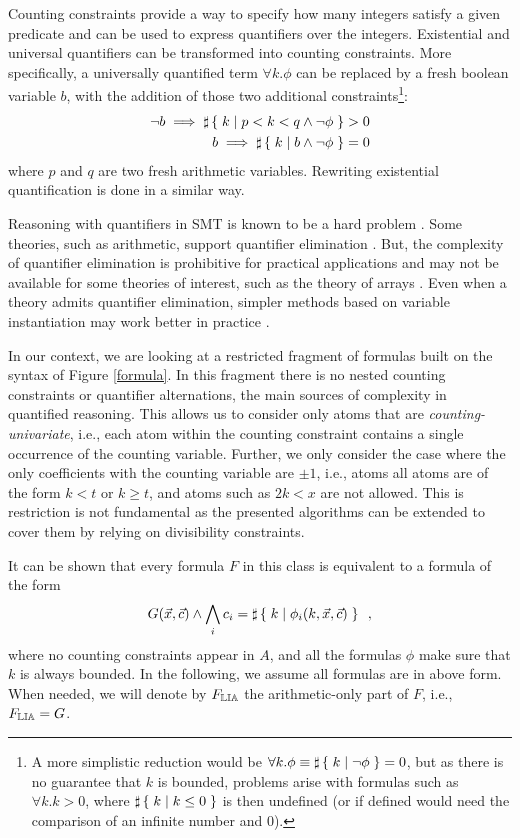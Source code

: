 Counting constraints provide a way to specify how many integers
satisfy a given predicate and can be used to
express quantifiers over the integers. Existential and universal quantifiers can
be transformed into counting constraints. More specifically, a universally
quantified term $\forall k . \phi$ can be replaced by a fresh boolean variable
$b$, with the addition of those two additional constraints\footnote{A more simplistic reduction would be
  $\forall k . \phi \equiv \sharp\left\lbrace\;k\;|\;\lnot \phi\;\right\rbrace = 0$, but as there is no guarantee
  that $k$ is bounded, problems arise with formulas such as $\forall k . k > 0$,
  where $\sharp\left\lbrace\;k\;|\;k\leq 0\;\right\rbrace$ is then undefined (or if defined would need the
  comparison of an infinite number and $0$).}:
\begin{align*}
  \lnot b \implies \sharp\left\lbrace\;k\;|\;p < k < q \land \lnot \phi\;\right\rbrace > 0 \\
  b \implies \sharp\left\lbrace\;k\;|\;b \land \lnot \phi\;\right\rbrace = 0
\end{align*}
 where $p$ and $q$ are two fresh arithmetic variables. Rewriting existential
 quantification is done in a similar way.

Reasoning with quantifiers in SMT is known to be a hard problem
\cite{ge2010solving,weispfenning1988complexity}. Some theories, such
as arithmetic, support quantifier elimination \cite{cooper}. But, the
complexity of quantifier elimination is prohibitive for practical
applications and may not be available for some theories of interest,
such as the theory of arrays \cite{bradley2006s}. Even when a theory
admits quantifier elimination,  simpler methods based on variable
instantiation may work better in practice \cite{dutertre2015solving}.

In our context, we are looking at a restricted fragment of formulas
built on the syntax of Figure \ref{formula}. In this fragment there is
no nested counting constraints or quantifier alternations, the main
sources of complexity in quantified reasoning. This allows us to
consider only atoms that are \emph{counting-univariate}, i.e., each
atom within the counting constraint contains a single occurrence of
the counting variable. Further, we only consider the case where the
only coefficients with the counting variable are $\pm 1$, i.e., atoms
all atoms are of the form $k < t$ or $k \geq t$, and atoms such as $2k <
x$ are not allowed. This is restriction is not fundamental as the
presented algorithms can be extended to cover them by relying on
divisibility constraints.

It can be shown that every formula $F$ in this class is equivalent to a
formula of the form
\begin{equation}
\label{maingoal}
G(\vec{x}, \vec{c}) \land \bigwedge_i c_i = \sharp\left\lbrace\;k\;|\;\phi_i(k, \vec{x}, \vec{c})\;\right\rbrace\enspace,
\end{equation}
where no counting constraints appear in $A$, and all the formulas $\phi$
make sure that $k$ is always bounded. In the following, we assume all
formulas are in above form. When needed, we will denote by $F_{\mathbb{LIA}}$
the arithmetic-only part of $F$, i.e., $F_{\mathbb{LIA}} = G$.

